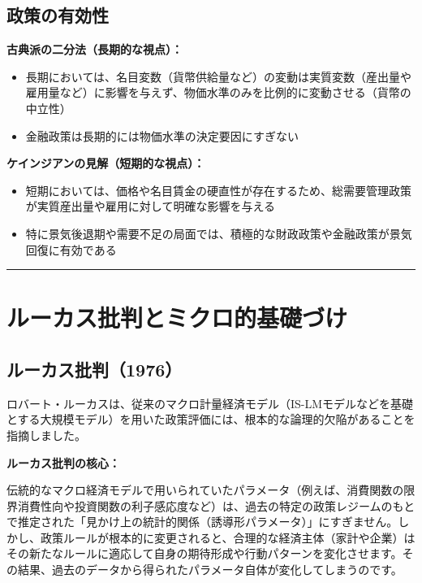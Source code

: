 \documentclass[
  japanese,
  lualatex,
  ja=standard,
  12pt,
  a4paper]{ltjsarticle}
\providecommand{\tightlist}{%
  \setlength{\itemsep}{0pt}\setlength{\parskip}{0pt}}
\begin{document}
\subsection{政策の有効性}\label{ux653fux7b56ux306eux6709ux52b9ux6027}

\textbf{古典派の二分法（長期的な視点）：}

\begin{itemize}
\tightlist
\item
  長期においては、名目変数（貨幣供給量など）の変動は実質変数（産出量や雇用量など）に影響を与えず、物価水準のみを比例的に変動させる（貨幣の中立性）
\item
  金融政策は長期的には物価水準の決定要因にすぎない
\end{itemize}

\textbf{ケインジアンの見解（短期的な視点）：}

\begin{itemize}
\tightlist
\item
  短期においては、価格や名目賃金の硬直性が存在するため、総需要管理政策が実質産出量や雇用に対して明確な影響を与える
\item
  特に景気後退期や需要不足の局面では、積極的な財政政策や金融政策が景気回復に有効である
\end{itemize}

\begin{center}\rule{0.5\linewidth}{0.5pt}\end{center}

\section{ルーカス批判とミクロ的基礎づけ}\label{ux30ebux30fcux30abux30b9ux6279ux5224ux3068ux30dfux30afux30edux7684ux57faux790eux3065ux3051}

\subsection{ルーカス批判（1976）}\label{ux30ebux30fcux30abux30b9ux6279ux52241976}

ロバート・ルーカスは、従来のマクロ計量経済モデル（IS-LMモデルなどを基礎とする大規模モデル）を用いた政策評価には、根本的な論理的欠陥があることを指摘しました。

\textbf{ルーカス批判の核心：}

伝統的なマクロ経済モデルで用いられていたパラメータ（例えば、消費関数の限界消費性向や投資関数の利子感応度など）は、過去の特定の政策レジームのもとで推定された「見かけ上の統計的関係（誘導形パラメータ）」にすぎません。しかし、政策ルールが根本的に変更されると、合理的な経済主体（家計や企業）はその新たなルールに適応して自身の期待形成や行動パターンを変化させます。その結果、過去のデータから得られたパラメータ自体が変化してしまうのです。
\end{document}
